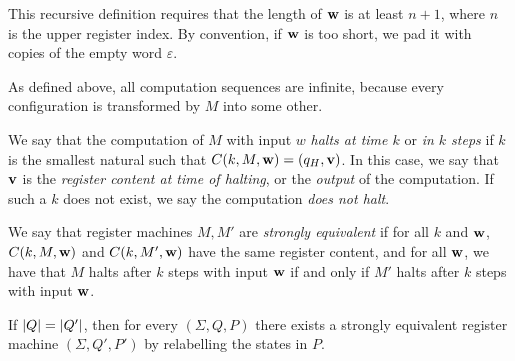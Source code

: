 \begin{remark}
	This recursive definition requires that the length of \( \vb w \) is at least \( n + 1 \), where \( n \) is the upper register index.
	By convention, if \( \vb w \) is too short, we pad it with copies of the empty word \( \varepsilon \).
\end{remark}
\begin{remark}
	As defined above, all computation sequences are infinite, because every configuration is transformed by \( M \) into some other.
\end{remark}
\begin{definition}
	We say that the computation of \( M \) with input \( w \) \emph{halts at time \( k \)} or \emph{in \( k \) steps} if \( k \) is the smallest natural such that \( C(k,M,\vb w) = (q_H,\vb v) \).
	In this case, we say that \( \vb v \) is the \emph{register content at time of halting}, or the \emph{output} of the computation.
	If such a \( k \) does not exist, we say the computation \emph{does not halt}.
\end{definition}
\begin{definition}
	We say that register machines \( M, M' \) are \emph{strongly equivalent} if for all \( k \) and \( \vb w \), \( C(k,M,\vb w) \) and \( C(k,M',\vb w) \) have the same register content, and for all \( \vb w \), we have that \( M \) halts after \( k \) steps with input \( \vb w \) if and only if \( M' \) halts after \( k \) steps with input \( \vb w \).
\end{definition}
\begin{remark}
	If \( \abs{Q} = \abs{Q'} \), then for every \( (\Sigma, Q, P) \) there exists a strongly equivalent register machine \( (\Sigma, Q', P') \) by relabelling the states in \( P \).
\end{remark}

